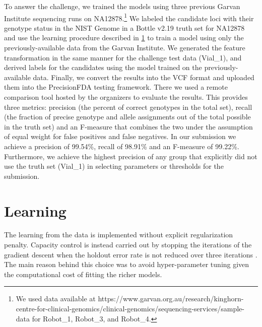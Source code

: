 \documentclass{article}
\newcommand{\w}{\mathbf{w}}
\newcommand{\x}{\mathbf{x}}
\newcommand{\R}{\mathbb{R}}
\newcommand{\tr}{{\!\top}}
\begin{document}
To answer the challenge, we trained the models using three previous Garvan Institute sequencing runs on NA12878.\footnote{We used data available at https://www.garvan.org.au/research/kinghorn-centre-for-clinical-genomics/clinical-genomics/sequencing-services/sample-data for Robot\_1, Robot\_3, and Robot\_4.}
We labeled the candidate loci with their genotype status in the NIST Genome in a Bottle v2.19 truth set for NA12878 and use the learning procedure described in \ref{sec:learning} to train a model using only the previously-available data from the Garvan Institute.
We generated the feature transformation in the same manner for the challenge test data (Vial\_1), and derived labels for the candidates using the model trained on the previously-available data.
Finally, we convert the results into the VCF format and uploaded them into the PrecisionFDA testing framework.
There we used a remote comparison tool hosted by the organizers to evaluate the results.
This provides three metrics: precision (the percent of correct genotypes in the total set), recall (the fraction of precise genotype and allele assignments out of the total possible in the truth set) and an F-measure that combines the two under the assumption of equal weight for false positives and false negatives.
In our submission we achieve a precision of 99.54\%, recall of 98.91\% and an F-measure of 99.22\%.
Furthermore, we achieve the highest precision of any group that explicitly did not use the truth set (Vial\_1) in selecting parameters or thresholds for the submission.

\section{Learning}
\label{sec:learning}

The learning from the data is implemented without explicit regularization penalty.
Capacity control is instead carried out by stopping the iterations of the gradient descent when the holdout error rate is not reduced over three iterations \citep{hardt2015train}.
The main reason behind this choice was to avoid hyper-parameter tuning given the computational cost of fitting the richer models.



\end{document}
